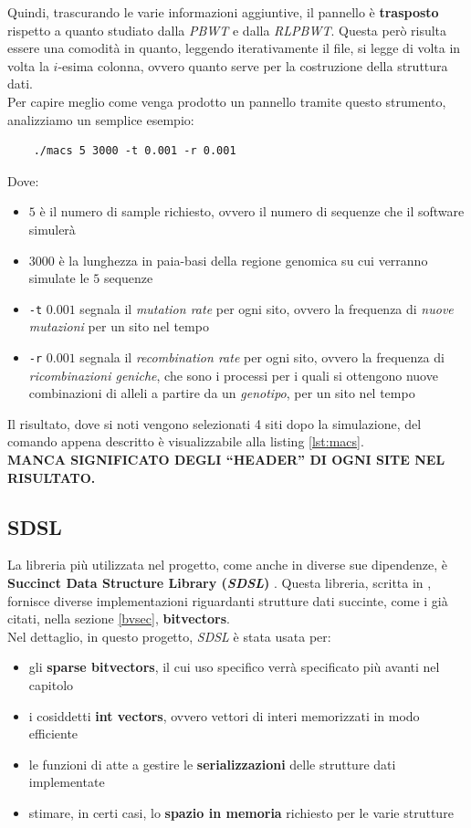 Quindi, trascurando le varie informazioni aggiuntive, il pannello è
\textbf{trasposto} rispetto a quanto studiato dalla \textit{PBWT} e dalla
\textit{RLPBWT}. Questa però risulta essere una comodità in quanto, leggendo
iterativamente il file, si legge di volta in volta la $i$-esima colonna, ovvero
quanto serve per la costruzione della struttura dati.\\
Per capire meglio come venga prodotto un pannello tramite questo strumento,
analizziamo un semplice esempio:
\begin{shaded}
  \begin{verbatim}
    ./macs 5 3000 -t 0.001 -r 0.001
  \end{verbatim}
\end{shaded}
\noindent
Dove:
\begin{itemize}
  \item $5$ è il numero di sample richiesto, ovvero il numero di sequenze che
  il software simulerà
  \item $3000$ è la lunghezza in paia-basi della regione genomica su cui
  verranno simulate le $5$ sequenze
  \item \texttt{-t} $0.001$ segnala il \textit{mutation rate} per ogni sito,
  ovvero la frequenza di \textit{nuove mutazioni} per un sito nel tempo 
  \item \texttt{-r} $0.001$ segnala il \textit{recombination rate} per ogni
  sito, ovvero la frequenza di \textit{ricombinazioni geniche}, che sono i
  processi per i quali si ottengono nuove combinazioni di alleli a partire da un
  \textit{genotipo}, per un sito nel tempo 
\end{itemize}
Il risultato, dove si noti vengono selezionati 4 siti dopo la simulazione, del
comando appena descritto è visualizzabile alla listing \ref{lst:macs}.\\ 
\textbf{MANCA SIGNIFICATO DEGLI ``HEADER'' DI OGNI SITE NEL RISULTATO.}
\subsection{SDSL}
La libreria più utilizzata nel progetto, come anche in diverse sue dipendenze, è
\textbf{Succinct Data Structure Library (\textit{SDSL})} \cite{sdsl}. Questa
libreria, scritta in , fornisce diverse implementazioni riguardanti
strutture dati succinte, come i già citati, nella sezione \ref{bvsec},
\textbf{bitvectors}.\\ 
Nel dettaglio, in questo progetto, \textit{SDSL} è stata usata per:
\begin{itemize}
  \item gli \textbf{sparse bitvectors}, il cui uso specifico verrà specificato
  più avanti nel capitolo
  \item i cosiddetti \textbf{int vectors}, ovvero vettori di interi memorizzati
  in modo efficiente
  \item le funzioni di atte a gestire le \textbf{serializzazioni} delle
  strutture dati implementate
  \item stimare, in certi casi, lo \textbf{spazio in memoria} richiesto per le
  varie strutture 
\end{itemize}
